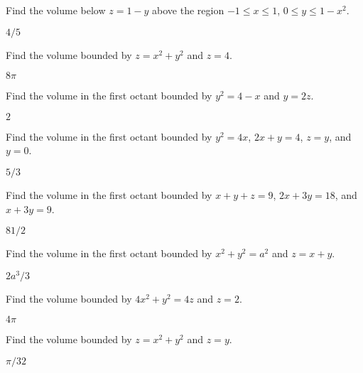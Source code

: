 \begin{exercises}
\begin{exercise} Find the volume below $z=1-y$ above the region
$-1\le x\le 1$, $0\le y\le 1-x^2$.
\begin{answer} $4/5$
\end{answer}\end{exercise}

\begin{exercise} Find the volume bounded by $z=x^2+y^2$ and $z=4$.
\begin{answer} $8\pi$
\end{answer}\end{exercise}


\begin{exercise} Find the volume in the first octant
bounded by $y^2=4-x$ and $y=2z$.
\begin{answer} $2$
\end{answer}\end{exercise}


\begin{exercise} Find the volume in the first octant
bounded by $y^2=4x$, $2x+y=4$, $z=y$,
and $y=0$.
\begin{answer} $5/3$
\end{answer}\end{exercise}

\begin{exercise} Find the volume in the first octant
bounded by $x+y+z=9$, $2x+3y=18$, and $x+3y=9$.
\begin{answer} $81/2$
\end{answer}\end{exercise}

\begin{exercise} Find the volume in the first octant
bounded by $x^2+y^2=a^2$ and $z=x+y$.
\begin{answer} $2a^3/3$
\end{answer}\end{exercise}

\begin{exercise} Find the volume bounded by $4x^2+y^2=4z$ and $z=2$.
\begin{answer} $4\pi$
\end{answer}\end{exercise}

\begin{exercise} Find the volume bounded by $z=x^2+y^2$ and $z=y$.
\begin{answer} $\pi/32$
\end{answer}\end{exercise}


\end{exercises}
